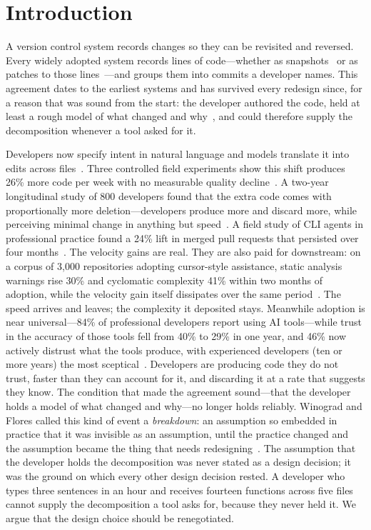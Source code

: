 \section{Introduction}

A version control system records changes so they can be revisited and reversed.
Every widely adopted system records lines of code---whether as
snapshots~\cite{git2026} or as patches to those
lines~\cite{roundy2005,pijul2024}---and groups them into commits a developer
names. This agreement dates to the earliest systems and has survived every
redesign since, for a reason that was sound from the start: the developer
authored the code, held at least a rough model of what changed and
why~\cite{naur1985,ko2006}, and could therefore supply the decomposition
whenever a tool asked for it.

Developers now specify intent in natural language and models translate it into
edits across files~\cite{sarkar2025}. Three controlled field experiments show this shift produces 26\% more code per
week with no measurable quality decline~\cite{cui2025}. A two-year longitudinal
study of 800 developers found that the extra code comes with proportionally more
deletion---developers produce more and discard more, while perceiving minimal
change in anything but speed~\cite{sergeyuk2026}. A field study of CLI agents in
professional practice found a 24\% lift in merged pull requests that persisted
over four months~\cite{murphyhill2026}. The velocity gains are real. They are also paid for
downstream: on a corpus of 3{,}000 repositories adopting cursor-style assistance,
static analysis warnings rise 30\% and cyclomatic complexity 41\% within two months
of adoption, while the velocity gain itself dissipates over the same
period~\cite{he2026}. The speed arrives and leaves; the complexity it deposited
stays. Meanwhile adoption is near universal---84\% of professional developers
report using AI tools---while trust in the accuracy of those tools fell from 40\%
to 29\% in one year, and 46\% now actively distrust what the tools produce,
with experienced developers (ten or more years) the most
sceptical~\cite{stackoverflow2025}. Developers are producing code they do not
trust, faster than they can account for it, and discarding it at a rate that
suggests they know. The condition that made the agreement sound---that the
developer holds a model of what changed and why---no longer holds reliably.
Winograd and Flores called this kind of event a \emph{breakdown}: an assumption so
embedded in practice that it was invisible as an assumption, until the practice
changed and the assumption became the thing that needs
redesigning~\cite{winograd1986}. The assumption that the developer holds the
decomposition was never stated as a design decision; it was the ground on which
every other design decision rested. A
developer who types three sentences in an hour and receives fourteen functions
across five files cannot supply the decomposition a tool asks for, because they
never held it. We argue that the design choice should be renegotiated.

